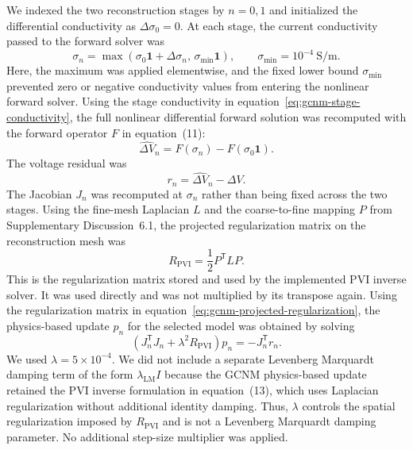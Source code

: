 \documentclass[11pt]{article}
\begin{document}
We indexed the two reconstruction stages by $n=0,1$ and initialized the differential conductivity as $\Delta\sigma_0=0$.
At each stage, the current conductivity passed to the forward solver was
\begin{equation}
    \sigma_n
    =
    \max\!\left(
        \sigma_0\mathbf{1}+\Delta\sigma_n,\,
        \sigma_{\min}\mathbf{1}
    \right),
    \qquad
    \sigma_{\min}=10^{-4}~\mathrm{S/m}.
\label{eq:gcnm-stage-conductivity}
\end{equation}
Here, the maximum was applied elementwise, and the fixed lower bound $\sigma_{\min}$ prevented zero or negative conductivity values from entering the nonlinear forward solver.
Using the stage conductivity in equation~\eqref{eq:gcnm-stage-conductivity}, the full nonlinear differential forward solution was recomputed with the forward operator $F$ in equation~(11):
\begin{equation*}
    \widehat{\Delta V}_n
    =
    F\!\left(\sigma_n\right)
    -F\!\left(\sigma_0\mathbf{1}\right).
\end{equation*}
The voltage residual was
\begin{equation*}
    r_n
    =
    \widehat{\Delta V}_n
    -\Delta V.
\end{equation*}
The Jacobian $J_n$ was recomputed at $\sigma_n$ rather than being fixed across the two stages.
Using the fine-mesh Laplacian $L$ and the coarse-to-fine mapping $P$ from Supplementary Discussion~6.1, the projected regularization matrix on the reconstruction mesh was
\begin{equation}
    R_{\mathrm{PVI}}
    =
    \frac{1}{2}
    P^{\mathsf T}LP.
\label{eq:gcnm-projected-regularization}
\end{equation}
This is the regularization matrix stored and used by the implemented PVI inverse solver.
It was used directly and was not multiplied by its transpose again.
Using the regularization matrix in equation~\eqref{eq:gcnm-projected-regularization}, the physics-based update $p_n$ for the selected model was obtained by solving
\begin{equation}
    \left(
        J_n^{\mathsf T}J_n
        +\lambda^2R_{\mathrm{PVI}}
    \right)p_n
    =
    -J_n^{\mathsf T}r_n.
\label{eq:gcnm-physics-update}
\end{equation}
We used $\lambda=5\times10^{-4}$.
We did not include a separate Levenberg Marquardt damping term of the form $\lambda_{\mathrm{LM}}I$ because the GCNM physics-based update retained the PVI inverse formulation in equation~(13), which uses Laplacian regularization without additional identity damping.
Thus, $\lambda$ controls the spatial regularization imposed by $R_{\mathrm{PVI}}$ and is not a Levenberg Marquardt damping parameter.
No additional step-size multiplier was applied.
\end{document}
